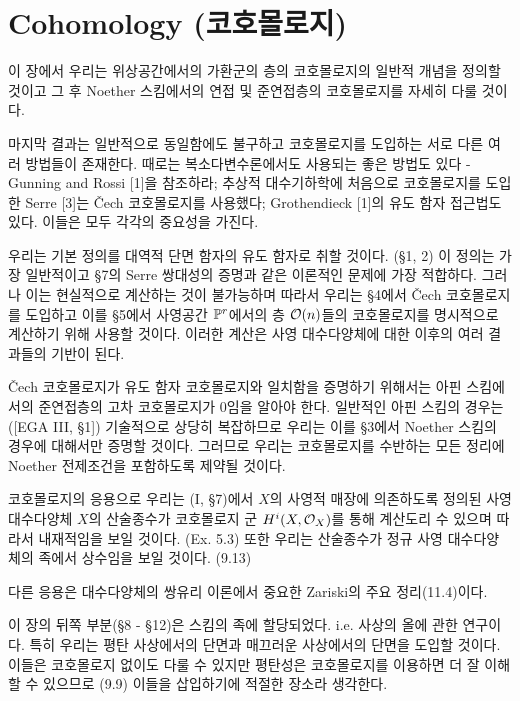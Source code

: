 
	\chapter{Cohomology (코호몰로지)}
	
	이 장에서 우리는 위상공간에서의 가환군의 층의 코호몰로지의 일반적 개념을 정의할 것이고
	그 후 Noether 스킴에서의 연접 및 준연접층의 코호몰로지를 자세히 다룰 것이다.
	
	마지막 결과는 일반적으로 동일함에도 불구하고 코호몰로지를 도입하는 서로 다른 여러 방법들이 존재한다.
	때로는 복소다변수론에서도 사용되는 좋은 방법도 있다 - Gunning and Rossi [1]을 참조하라;
	추상적 대수기하학에 처음으로 코호몰로지를 도입한 Serre [3]는 \v Cech 코호몰로지를 사용했다;
	Grothendieck [1]의 유도 함자 접근법도 있다. 이들은 모두 각각의 중요성을 가진다.
	
	우리는 기본 정의를 대역적 단면 함자의 유도 함자로 취할 것이다. (\S 1, 2)
	이 정의는 가장 일반적이고 \S 7의 Serre 쌍대성의 증명과 같은 이론적인 문제에 가장 적합하다.
	그러나 이는 현실적으로 계산하는 것이 불가능하며 따라서 우리는 \S 4에서 \v Cech 코호몰로지를 도입하고
	이를 \S 5에서 사영공간 $\mathbb{P}^r$에서의 층 $\mathcal{O}(n)$들의 코호몰로지를 명시적으로 계산하기 위해 사용할 것이다.
	이러한 계산은 사영 대수다양체에 대한 이후의 여러 결과들의 기반이 된다.
	
	\v Cech 코호몰로지가 유도 함자 코호몰로지와 일치함을 증명하기 위해서는 아핀 스킴에서의 준연접층의 고차 코호몰로지가 0임을 알아야 한다.
	일반적인 아핀 스킴의 경우는 ([EGA III, \S 1]) 기술적으로 상당히 복잡하므로
	우리는 이를 \S 3에서 Noether 스킴의 경우에 대해서만 증명할 것이다.
	그러므로 우리는 코호몰로지를 수반하는 모든 정리에 Noether 전제조건을 포함하도록 제약될 것이다.
	
	코호몰로지의 응용으로 우리는 (I, \S 7)에서 $X$의 사영적 매장에 의존하도록 정의된 사영 대수다양체 $X$의 산술종수가
	코호몰로지 군 $H^i(X,\mathcal{O}_X)$를 통해 계산도리 수 있으며 따라서 내재적임을 보일 것이다. (Ex. 5.3)
	또한 우리는 산술종수가 정규 사영 대수다양체의 족에서 상수임을 보일 것이다. (9.13)
	
	다른 응용은 대수다양체의 쌍유리 이론에서 중요한 Zariski의 주요 정리(11.4)이다.
	
	이 장의 뒤쪽 부분(\S 8 - \S 12)은 스킴의 족에 할당되었다. i.e. 사상의 올에 관한 연구이다.
	특히 우리는 평탄 사상에서의 단면과 매끄러운 사상에서의 단면을 도입할 것이다.
	이들은 코호몰로지 없이도 다룰 수 있지만 평탄성은 코호몰로지를 이용하면 더 잘 이해할 수 있으므로 (9.9)
	이들을 삽입하기에 적절한 장소라 생각한다.
	
	
